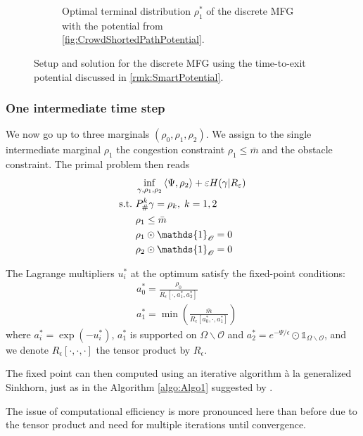 \documentclass[../report.tex]{subfiles}
\begin{document}
\begin{figure}
\begin{subfigure}[t]{.4\linewidth}
		\caption{Optimal terminal distribution $\rho^*_1$ of the discrete MFG with the potential from \cref{fig:CrowdShortedPathPotential}.}\label{fig:2MargEikonalGame}
	\end{subfigure}
	\caption{Setup and solution for the discrete MFG using the time-to-exit potential discussed in \cref{rmk:SmartPotential}.}
\end{figure}

\subsubsection{One intermediate time step}

We now go up to three marginals $(\rho_0,\rho_1,\rho_2)$. We assign to the single intermediate marginal $\rho_1$ the congestion constraint $\rho_1 \leq \bar{m}$ and the obstacle constraint. The primal problem then reads
\begin{equation}
\begin{aligned}
	&\inf_{\gamma,\rho_1,\rho_2}{} \langle \Psi, \rho_2\rangle + \epsilon H(\gamma | R_\epsilon) \\
	\suchthat \ & P^k_\#\gamma = \rho_k,\; k = 1,2 \\
	& \rho_1 \leq \bar{m} \\
	& \rho_1\odot\mathds{1}_{\mathscr O} = 0\\
	& \rho_2\odot\mathds{1}_{\mathscr O} = 0
\end{aligned}
\end{equation}

\begin{prop}
The Lagrange multipliers $u_i^*$ at the optimum satisfy the fixed-point conditions:
\begin{align*}
	&a_0^* = \frac{\rho_0}{R_\epsilon[\cdot, a_1^*, a_2^*]} \\
	&a_1^* = \min\left(\frac{\bar{m}}{R_\epsilon[a_0^*,\cdot,a_1^*]}\right)
\end{align*}
where $a_i^* = \exp(-u_i^*)$, $a_1^*$ is supported on $\Omega\backslash\mathscr{O}$ and $a_2^* = e^{-\Psi/\epsilon}\odot\mathds{1}_{\Omega\backslash\mathscr{O}}$, and we denote $R_\epsilon[\cdot,\cdot,\cdot]$ the tensor product by $R_\epsilon$.
\end{prop}

The fixed point can then computed using an iterative algorithm à la generalized Sinkhorn, just as in the Algorithm \autoref{algo:Algo1} suggested by \cite{benamou2018entropy}.

The issue of computational efficiency is more pronounced here than before due to the tensor product and need for multiple iterations until convergence.
\end{document}
